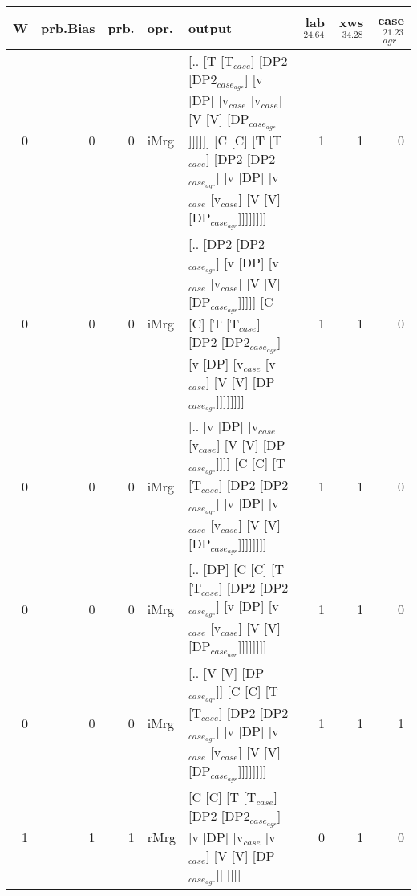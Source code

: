 \begin{tabularx}{\linewidth}{rrrlXrrr}
\hline
   W &   prb.Bias &   prb. & opr.   & output                                                                                                                                                                             &   lab$^{24.64}$ &   xws$^{34.28}$ &   case$_{agr}^{21.23}$ \\
\hline
   0 &       0 &   0 & iMrg & [.. [T [T$_{case}$] [DP2 [DP2$_{case_{agr}}$] [v [DP] [v$_{case}$ [v$_{case}$] [V [V] [DP$_{case_{agr}}$]]]]]] [C [C] [T [T$_{case}$] [DP2 [DP2$_{case_{agr}}$] [v [DP] [v$_{case}$ [v$_{case}$] [V [V] [DP$_{case_{agr}}$]]]]]]]] &             1 &             1 &                  0 \\
   0 &       0 &   0 & iMrg & [.. [DP2 [DP2$_{case_{agr}}$] [v [DP] [v$_{case}$ [v$_{case}$] [V [V] [DP$_{case_{agr}}$]]]]] [C [C] [T [T$_{case}$] [DP2 [DP2$_{case_{agr}}$] [v [DP] [v$_{case}$ [v$_{case}$] [V [V] [DP$_{case_{agr}}$]]]]]]]]              &             1 &             1 &                  0 \\
   0 &       0 &   0 & iMrg & [.. [v [DP] [v$_{case}$ [v$_{case}$] [V [V] [DP$_{case_{agr}}$]]]] [C [C] [T [T$_{case}$] [DP2 [DP2$_{case_{agr}}$] [v [DP] [v$_{case}$ [v$_{case}$] [V [V] [DP$_{case_{agr}}$]]]]]]]]                                   &             1 &             1 &                  0 \\
   0 &       0 &   0 & iMrg & [.. [DP] [C [C] [T [T$_{case}$] [DP2 [DP2$_{case_{agr}}$] [v [DP] [v$_{case}$ [v$_{case}$] [V [V] [DP$_{case_{agr}}$]]]]]]]]                                                                               &             1 &             1 &                  0 \\
   0 &       0 &   0 & iMrg & [.. [V [V] [DP$_{case_{agr}}$]] [C [C] [T [T$_{case}$] [DP2 [DP2$_{case_{agr}}$] [v [DP] [v$_{case}$ [v$_{case}$] [V [V] [DP$_{case_{agr}}$]]]]]]]]                                                              &             1 &             1 &                  1 \\
   1 &       1 &   1 & rMrg & [C [C] [T [T$_{case}$] [DP2 [DP2$_{case_{agr}}$] [v [DP] [v$_{case}$ [v$_{case}$] [V [V] [DP$_{case_{agr}}$]]]]]]]                                                                                         &             0 &             1 &                  0 \\
\hline
\end{tabularx}\endgroup\\
